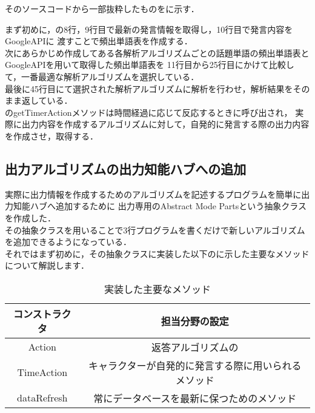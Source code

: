 そのソースコードから一部抜粋したものをに示す．


まず初めに，の8行，9行目で最新の発言情報を取得し，10行目で発言内容をGoogleAPIに
渡すことで頻出単語表を作成する．
\\
次にあらかじめ作成してある各解析アルゴリズムごとの話題単語の頻出単語表とGoogleAPIを用いて取得した頻出単語表を
11行目から25行目にかけて比較して，一番最適な解析アルゴリズムを選択している．
\\
最後に45行目にて選択された解析アルゴリズムに解析を行わせ，解析結果をそのまま返している．\\


のgetTimerActionメソッドは時間経過に応じて反応するときに呼び出され，
実際に出力内容を作成するアルゴリズムに対して，自発的に発言する際の出力内容を作成させ，取得する．\\



\subsection{出力アルゴリズムの出力知能ハブへの追加}
実際に出力情報を作成するためのアルゴリズムを記述するプログラムを簡単に出力知能ハブへ追加するために
出力専用のAbstract Mode Partsという抽象クラスを作成した．\\

その抽象クラスを用いることで3行プログラムを書くだけで新しいアルゴリズムを追加できるようになっている．\\

それではまず初めに，その抽象クラスに実装した以下のに示した主要なメソッドについて解説します．\\

\begin{table}[tbh]
	\caption{実装した主要なメソッド} \label{tab:parts}
	\begin{center}
		\begin{tabular}[htb]{c|c}
		\hline
		コンストラクタ & 担当分野の設定 \\
		\hline
		Action & 返答アルゴリズムの \\
		\hline
		TimeAction & キャラクターが自発的に発言する際に用いられるメソッド \\
		\hline
		dataRefresh & 常にデータベースを最新に保つためのメソッド \\
		\hline
		\end{tabular}
	\end{center}
\end{table}

